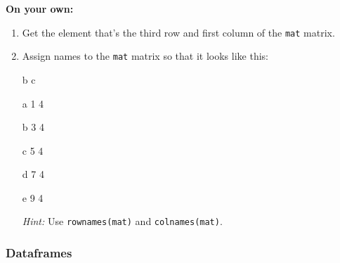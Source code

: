 \documentclass{exam}
\begin{document}
\noindent\textbf{On your own:}

\begin{enumerate}
\item Get the element that's the third row and first column of the \texttt{mat} matrix.

\item Assign names to the \texttt{mat} matrix so that it looks like this:

\indent b c
   
  a 1 4

  b 3 4

  c 5 4

  d 7 4

  e 9 4

\textit{Hint:} Use \texttt{rownames(mat)} and \texttt{colnames(mat)}.

\end{enumerate}
\begin{solution}
\end{solution}

\subsubsection{Dataframes}
\end{document}
